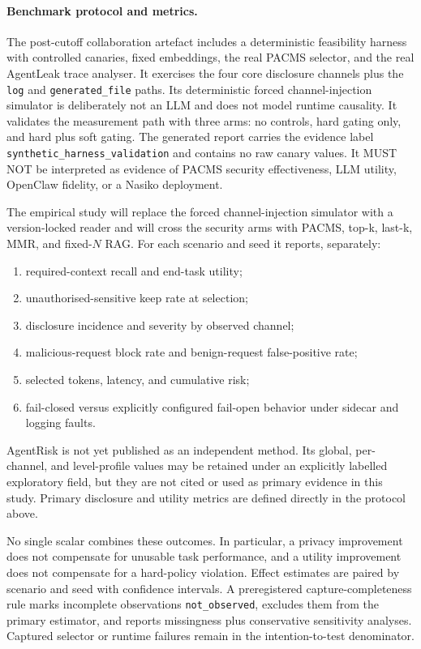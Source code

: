 \paragraph{Benchmark protocol and metrics.}
The post-cutoff collaboration artefact includes a
deterministic feasibility harness with controlled canaries,
fixed embeddings, the real PACMS selector, and the real
AgentLeak trace analyser. It exercises the four core
disclosure channels plus the \texttt{log} and
\texttt{generated\_file} paths. Its deterministic
forced channel-injection simulator is deliberately not an
LLM and does not model runtime causality. It validates the measurement path with three
arms: no controls, hard gating only, and hard plus soft
gating. The generated report carries the evidence label
\texttt{synthetic\_harness\_validation} and contains no raw
canary values. It MUST NOT be interpreted as evidence of
PACMS security effectiveness, LLM utility, OpenClaw
fidelity, or a Nasiko deployment.

The empirical study will replace the forced channel-injection simulator with a
version-locked reader and will cross the security arms with
PACMS, top-k, last-k, MMR, and fixed-$N$ RAG. For each
scenario and seed it reports, separately:

\begin{enumerate}
  \item required-context recall and end-task utility;
  \item unauthorised-sensitive keep rate at selection;
  \item disclosure incidence and severity by observed
    channel;
  \item malicious-request block rate and benign-request
    false-positive rate;
  \item selected tokens, latency, and cumulative risk;
  \item fail-closed versus explicitly configured fail-open
    behavior under sidecar and logging faults.
\end{enumerate}

AgentRisk is not yet published as an independent method.
Its global, per-channel, and level-profile values may be
retained under an explicitly labelled exploratory field,
but they are not cited or used as primary evidence in this
study. Primary disclosure and utility metrics are defined
directly in the protocol above.

No single scalar combines these outcomes. In particular, a
privacy improvement does not compensate for unusable task
performance, and a utility improvement does not compensate
for a hard-policy violation. Effect estimates are paired by
scenario and seed with confidence intervals. A preregistered
capture-completeness rule marks incomplete observations
\texttt{not\_observed}, excludes them from the primary
estimator, and reports missingness plus conservative
sensitivity analyses. Captured selector or runtime failures
remain in the intention-to-test denominator.

